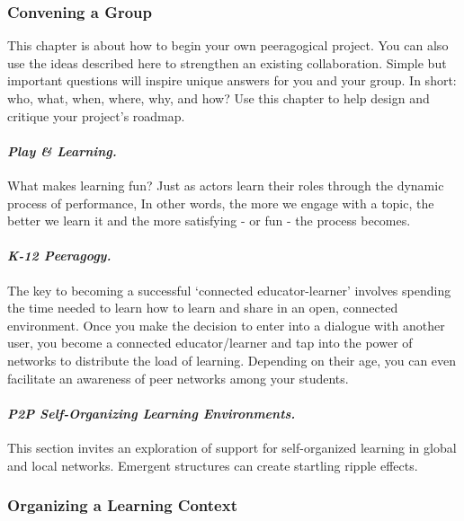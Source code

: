 \subsubsection{Convening a Group}\label{convening-a-group}

This chapter is about how to begin your own peeragogical project. You
can also use the ideas described here to strengthen an existing
collaboration. Simple but important questions will inspire unique
answers for you and your group. In short: who, what, when, where, why,
and how? Use this chapter to help design and critique your project's
roadmap.

\paragraph{\emph{Play \& Learning.}}\label{play-learning.}

What makes learning fun? Just as actors learn their roles through the
dynamic process of performance, In other words, the more we engage with
a topic, the better we learn it and the more satisfying - or fun - the
process becomes.

\paragraph{\emph{K-12 Peeragogy.}}\label{k-12-peeragogy.}

The key to becoming a successful `connected educator-learner' involves
spending the time needed to learn how to learn and share in an open,
connected environment. Once you make the decision to enter into a
dialogue with another user, you become a connected educator/learner and
tap into the power of networks to distribute the load of learning.
Depending on their age, you can even facilitate an awareness of peer
networks among your students.

\paragraph{\emph{P2P Self-Organizing Learning
Environments.}}\label{p2p-self-organizing-learning-environments.}

This section invites an exploration of support for self-organized
learning in global and local networks. Emergent structures can create
startling ripple effects.

\subsubsection{Organizing a Learning
Context}\label{organizing-a-learning-context}

